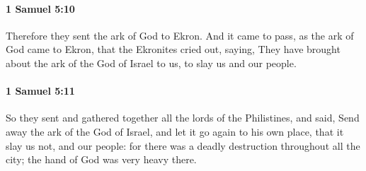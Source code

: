 		\paragraph{1 Samuel 5:10} %
			\label{1SAMUEL-5-10}

			Therefore they sent the ark of God to Ekron. And it came to pass, as the ark of God came to Ekron, that the Ekronites cried out, saying, They have brought about the ark of the God of Israel to us, to slay us and our people.


		\paragraph{1 Samuel 5:11} %
			\label{1SAMUEL-5-11}

			So they sent and gathered together all the lords of the Philistines, and said, Send away the ark of the God of Israel, and let it go again to his own place, that it slay us not, and our people: for there was a deadly destruction throughout all the city; the hand of God was very heavy there.


